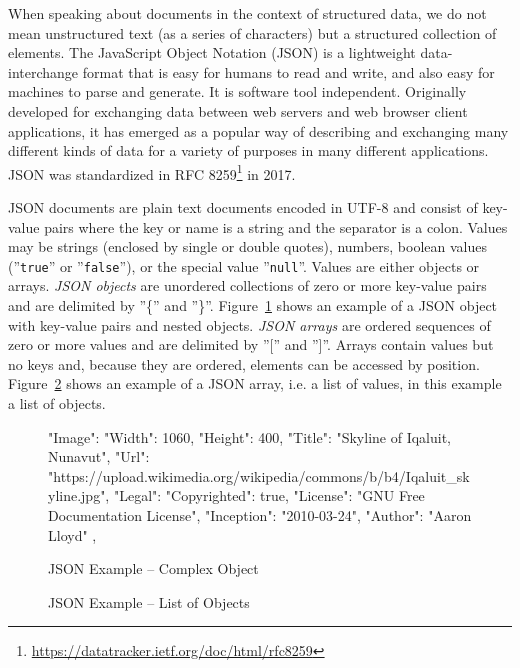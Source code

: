 When speaking about documents in the context of structured data, we do not mean unstructured text (as a series of characters) but a structured collection of elements. The JavaScript Object Notation (JSON) is a lightweight data-interchange format that is easy for humans to read and write, and also easy for machines to parse and generate. It is software tool independent. Originally developed for exchanging data between web servers and web browser client applications, it has emerged as a popular way of describing and exchanging many different kinds of data for a variety of purposes in many different applications. JSON was standardized in RFC 8259\footnote{\url{https://datatracker.ietf.org/doc/html/rfc8259}} in 2017.

JSON documents are plain text documents encoded in UTF-8 and consist of key-value pairs where the key or name is a string and the separator is a colon. Values may be strings (enclosed by single or double quotes), numbers, boolean values (''\texttt{true}'' or ''\texttt{false}''), or the special value ''\texttt{null}''. Values are either objects or arrays. \emph{JSON objects} are unordered collections of zero or more key-value pairs and are delimited by ''\{'' and ''\}''. Figure~\ref{fig:json1} shows an example of a JSON object with key-value pairs and nested objects. \emph{JSON arrays} are ordered sequences of zero or more values and are delimited by ''['' and '']''. Arrays contain values but no keys and, because they are ordered, elements can be accessed by position. Figure~\ref{fig:jason2} shows an example of a JSON array, i.e. a list of values, in this example a list of objects.

\begin{figure}[h]
\begin{jsoncode}
{
  "Image": {
    "Width": 1060,
    "Height": 400,
    "Title": "Skyline of Iqaluit, Nunavut",
    "Url": 
"https://upload.wikimedia.org/wikipedia/commons/b/b4/Iqaluit_skyline.jpg",
    "Legal": {
      "Copyrighted": true,
      "License": "GNU Free Documentation License",
      "Inception": "2010-03-24",
      "Author": "Aaron Lloyd"
     },
  }
}
\end{jsoncode}
\caption{JSON Example -- Complex Object}
\label{fig:json1}
\end{figure}

\begin{figure}
\begin{jsoncode}
\end{jsoncode}
\caption{JSON Example -- List of Objects}
\label{fig:jason2}
\end{figure}

